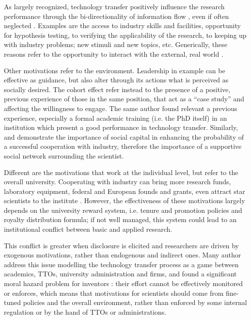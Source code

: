 As largely recognized, technology transfer positively influence the research performance through the bi-directionality of information flow \citep{Geuna2009}, even if often neglected \citep{DEste2007}. Examples are the access to industry skills and facilities, opportunity for hypothesis testing, to verifying the applicability of the research, to keeping up with industry problems; new stimuli and new topics, etc. Generically, these reasons refer to the opportunity to interact with the external, real world \citep{Baldini2007}. 

Other motivations refer to the environment. Leadership in example can be effective as guidance, but also alter through its actions what is perceived as socially desired. The cohort effect \citep{Bercovitz2006} refer instead to the presence of a positive, previous experience of those in the same position, that act as a \enquote{case study} and affecting the willingness to engage. The same author found relevant a previous experience, especially a formal academic training (i.e. the PhD itself) in an institution which present a good performance in technology transfer. Similarly, \citet{Murray2004} and \citet{Link2007} demonstrate the importance of social capital in enhancing the probability of a successful cooperation with industry, therefore the importance of a supportive social network surrounding the scientist.

Different are the motivations that work at the individual level, but refer to the overall university. Cooperating with industry can bring more research funds, laboratory equipment, federal and European founds and grants, even attract star scientists to the institute \citep{OShea2004, Baldini2007, DEste2007}. However, the effectiveness of these motivations largely depends on the university reward system, i.e. tenure and promotion policies and royalty distribution formula; if not well managed, this system could lead to an institutional conflict between basic and applied research. 

This conflict is greater when disclosure is elicited and researchers are driven by exogenous motivations, rather than endogenous and indirect ones. Many author address this issue modelling the technology transfer process as a game between academics, TTOs, university administration and firms, and found a significant moral hazard problem for inventors \citep{Jensen1998}: their effort cannot be effectively monitored or enforces, which means that motivations for scientists should come from fine-tuned policies and the overall environment, rather than enforced by some internal regulation or by the hand of TTOs or administrations. 

